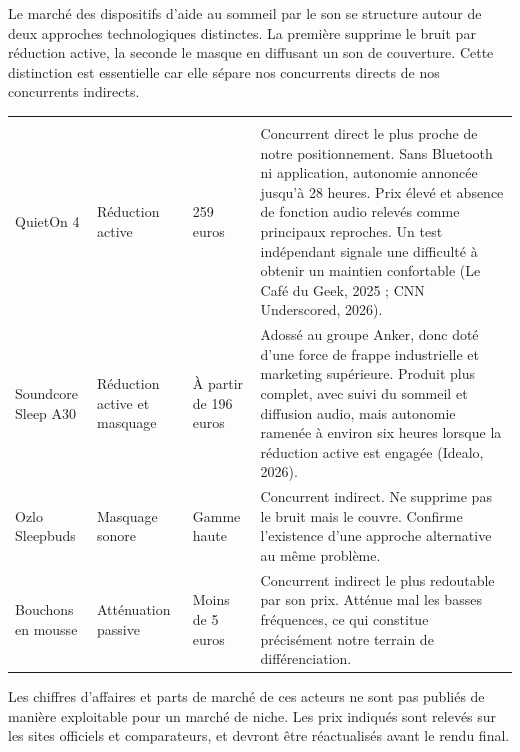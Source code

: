 Le marché des dispositifs d'aide au sommeil par le son se structure autour de
deux approches technologiques distinctes. La première supprime le bruit par
réduction active, la seconde le masque en diffusant un son de couverture. Cette
distinction est essentielle car elle sépare nos concurrents directs de nos
concurrents indirects.

\begin{center}
\begin{xltabular}{\textwidth}{P{2.8cm}P{2.4cm}P{2.2cm}L}
\toprule
{} &  &  &  \\
\midrule
\endfirsthead
\toprule
{} &  &  &  \\
\midrule
\endhead

QuietOn 4
&
Réduction active
&
259 euros
&
Concurrent direct le plus proche de notre positionnement. Sans Bluetooth ni
application, autonomie annoncée jusqu'à 28 heures. Prix élevé et absence de
fonction audio relevés comme principaux reproches. Un test indépendant signale
une difficulté à obtenir un maintien confortable (Le Café du Geek, 2025 ;
CNN Underscored, 2026). \\

Soundcore Sleep A30
&
Réduction active et masquage
&
À partir de 196 euros
&
Adossé au groupe Anker, donc doté d'une force de frappe industrielle et
marketing supérieure. Produit plus complet, avec suivi du sommeil et diffusion
audio, mais autonomie ramenée à environ six heures lorsque la réduction active
est engagée (Idealo, 2026). \\

Ozlo Sleepbuds
&
Masquage sonore
&
Gamme haute
&
Concurrent indirect. Ne supprime pas le bruit mais le couvre. Confirme
l'existence d'une approche alternative au même problème. \\

Bouchons en mousse
&
Atténuation passive
&
Moins de 5 euros
&
Concurrent indirect le plus redoutable par son prix. Atténue mal les basses
fréquences, ce qui constitue précisément notre terrain de différenciation. \\
\bottomrule
\end{xltabular}
\end{center}

\begin{hypothese}
Les chiffres d'affaires et parts de marché de ces acteurs ne sont pas publiés
de manière exploitable pour un marché de niche. Les prix indiqués sont relevés
sur les sites officiels et comparateurs, et devront être réactualisés avant le
rendu final.
\end{hypothese}

